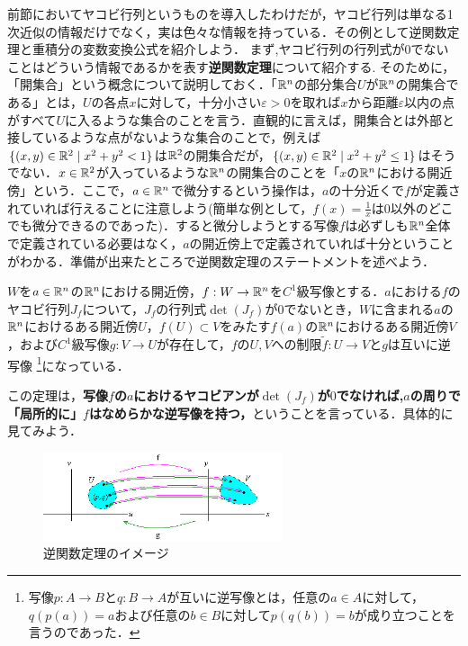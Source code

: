 前節においてヤコビ行列というものを導入したわけだが，ヤコビ行列は単なる1次近似の情報だけでなく，実は色々な情報を持っている．その例として逆関数定理と重積分の変数変換公式を紹介しよう．
まず,ヤコビ行列の行列式が$0$でないことはどういう情報であるかを表す\textbf{逆関数定理}について紹介する.
そのために，「開集合」という概念について説明しておく．「${\mathbb R}^n$の部分集合$U$が${\mathbb R}^n$の開集合である」とは，$U$の各点$x$に対して，十分小さい$\varepsilon>0$を取れば$x$から距離$\varepsilon$以内の点がすべて$U$に入るような集合のことを言う．直観的に言えば，開集合とは外部と接しているような点がないような集合のことで，例えば$\{(x,y)\in{\mathbb R}^2\mid x^2+y^2<1\}$は${\mathbb R}^2$の開集合だが，$\{(x,y)\in{\mathbb R}^2\mid x^2+y^2\le1\}$はそうでない．$x\in{\mathbb R}^2$が入っているような${\mathbb R}^n$の開集合のことを「$x$の${\mathbb R}^n$における開近傍」という．ここで，$a\in{\mathbb R}^n$で微分するという操作は，$a$の十分近くで$f$が定義されていれば行えることに注意しよう(簡単な例として，$f(x)=\frac{1}{x}$は0以外のどこでも微分できるのであった)．すると微分しようとする写像$f$は必ずしも${\mathbb R}^n$全体で定義されている必要はなく，$a$の開近傍上で定義されていれば十分ということがわかる．準備が出来たところで逆関数定理のステートメントを述べよう．
\begin{s_theo}[逆関数定理]
$W$を$a\in{\mathbb R}^n$の${\mathbb R}^n$における開近傍，$f:W\rightarrow{\mathbb R}^n$を$C^1$級写像とする．$a$における$f$のヤコビ行列$J_f$について，$J_f$の行列式$\det(J_f)$が0でないとき，$W$に含まれる$a$の${\mathbb R}^n$におけるある開近傍$U$，$f(U)\subset V$をみたす$f(a)$の${\mathbb R}^n$におけるある開近傍$V$，および$C^1$級写像$g:V\rightarrow U$が存在して，$f$の$U,V$への制限$\tilde{f}:U\rightarrow V$と$g$は互いに逆写像
\footnote{写像$p:A\rightarrow B$と$q:B\rightarrow A$が互いに逆写像とは，任意の$a\in A$に対して，$q(p(a))=a$および任意の$b\in B$に対して$p(q(b))=b$が成り立つことを言うのであった．}になっている．
\end{s_theo}
この定理は，\textbf{写像$f$の$a$におけるヤコビアンが$\det(J_f)$が$0$でなければ,$a$の周りで「局所的に」$f$はなめらかな逆写像を持つ，}ということを言っている．具体的に見てみよう．
\begin{figure}[h]
  \begin{center} 
    \includegraphics[width=7.0cm]{dev_invfunc}
    \caption{逆関数定理のイメージ}
  \end{center}
\end{figure}
